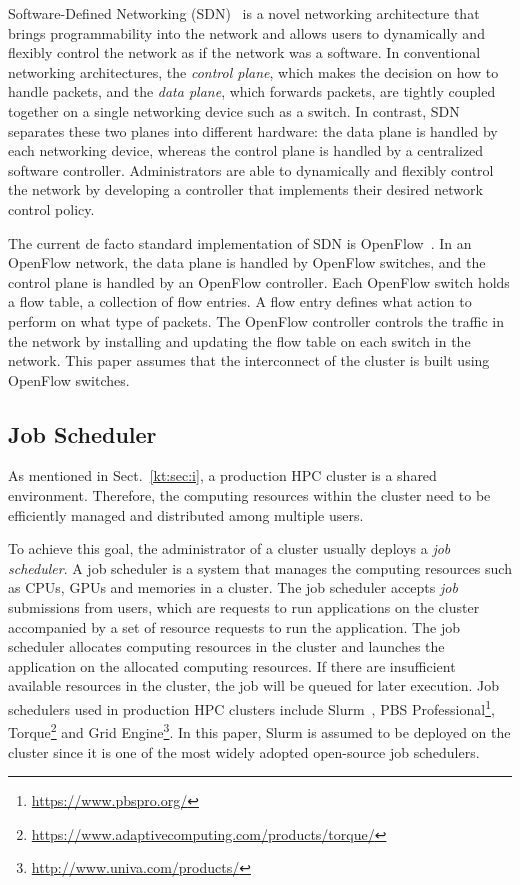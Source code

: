 \documentclass[graybox]{svmult}
\begin{document}
Software-Defined Networking (SDN)~\cite{Jamalian2015} is a novel networking
architecture that brings programmability into the network and allows users to
dynamically and flexibly control the network as if the network was a software.
In conventional networking architectures, the \textit{control plane}, which
makes the decision on how to handle packets, and the \textit {data plane},
which forwards packets, are tightly coupled together on a single networking
device such as a switch. In contrast, SDN separates these two planes into
different hardware: the data plane is handled by each networking device,
whereas the control plane is handled by a centralized software controller.
Administrators are able to dynamically and flexibly control the network by
developing a controller that implements their desired network control policy.

The current de facto standard implementation of SDN is
OpenFlow~\cite{McKeown2008}. In an OpenFlow network, the data plane is handled
by OpenFlow switches, and the control plane is handled by an OpenFlow
controller. Each OpenFlow switch holds a flow table, a collection of flow
entries. A flow entry defines what action to perform on what type of packets.
The OpenFlow controller controls the traffic in the network by installing and
updating the flow table on each switch in the network. This paper assumes that
the interconnect of the cluster is built using OpenFlow switches.

\subsection{Job Scheduler}\label{kt:sec:ii-jms}

As mentioned in Sect.~\ref{kt:sec:i}, a production HPC cluster is a shared
environment. Therefore, the computing resources within the cluster need to be
efficiently managed and distributed among multiple users.

To achieve this goal, the administrator of a cluster usually deploys a
\textit{job scheduler}. A job scheduler is a system that manages the computing
resources such as CPUs, GPUs and memories in a cluster. The job scheduler
accepts \textit{job} submissions from users, which are requests to run
applications on the cluster accompanied by a set of resource requests to run
the application. The job scheduler allocates computing resources in the
cluster and launches the application on the allocated computing resources. If
there are insufficient available resources in the cluster, the job will be
queued for later execution. Job schedulers used in production HPC clusters
include Slurm~\cite{Yoo2003}, PBS
Professional\footnote{\url{https://www.pbspro.org/}},
Torque\footnote{\url{https://www.adaptivecomputing.com/products/torque/}} and
Grid Engine\footnote{\url{http://www.univa.com/products/}}. In this paper,
Slurm is assumed to be deployed on the cluster since it is one of the most
widely adopted open-source job schedulers.
\end{document}
